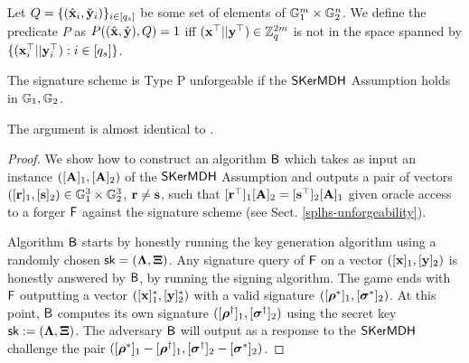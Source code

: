 Let $Q=\{ ({\hat{\mathbf{x}}}_i,\check{\mathbf{y}}_i) \}_{i \in [q_s]}$ be some set of elements of $\mathbb{G}_1^{m} \times \mathbb{G}_2^n$. We define the predicate $P$ as $P(({\hat{\mathbf{x}}},\check{\mathbf{y}}),Q)=1$ iff $(\mathbf{x}^{\top}||\mathbf{y}^{\top}) \in \mathbb{Z}_q^{2m}$ is not in the space spanned by $\{(\mathbf{x}_i^{\top}||\mathbf{y}_i^{\top}) :i \in [q_s]\}$. 

\begin{theorem} The signature scheme is Type P unforgeable if the $\mathsf{SKerMDH}$ Assumption holds in $\mathbb{G}_1,\mathbb{G}_2$.
\end{theorem}
The argument is almost identical to  \cite{C:LPJY13}.
\begin{proof} We show how to construct an algorithm $\mathsf{B}$ which takes as input an instance $([\mathbf{{A}}]_1,[\mathbf{{A}}]_2)$ of the $\mathsf{SKerMDH}$ Assumption and outputs a pair of vectors $([\mathbf{r}]_1,[\mathbf{s}]_2) \in \mathbb{G}_1^{3} \times \mathbb{G}_2^{3}$, $\mathbf{r} \neq \mathbf{s}$, such that 
$[\mathbf{r}^{\top}]_1 [\mathbf{{A}}]_2=[\mathbf{s}^{\top}]_2 [\mathbf{{A}}]_1$ given oracle access to a forger $\mathsf{F}$ against the signature scheme
(see Sect. \ref{splhs-unforgeability}). 

Algorithm $\mathsf{B}$ starts by honestly running the key generation algorithm 
using a randomly chosen $\mathsf{sk}=(\mathbf{{\Lambda}},\mathbf{{\Xi}})$. Any signature query of $\mathsf{F}$ on a vector
$([\mathbf{x}]_1,[\mathbf{y}]_2)$ is honestly answered by $\mathsf{B}$, by running the signing algorithm.
The game ends with $\mathsf{F}$ outputting a vector $([\mathbf{x}]_1^*,[\mathbf{y}]_2^*)$ 
with a valid signature $([{\boldsymbol \rho}^{*}]_1, [{\boldsymbol \sigma}^{*}]_2)$. At this point, $\mathsf{B}$ computes its own signature $([{\boldsymbol \rho}^{\dagger}]_1, [{\boldsymbol \sigma}^{\dagger}]_2)$ using the secret key $\mathsf{sk}:=(\mathbf{{\Lambda}},\mathbf{{\Xi}})$. The adversary $\mathsf{B}$ will output as a response to the $\mathsf{SKerMDH}$ challenge the pair $([{\boldsymbol \rho}^{*}]_1-[{\boldsymbol \rho}^{\dagger}]_1,[ {\boldsymbol \sigma}^{\dagger}]_2-[{\boldsymbol \sigma}^{*}]_2)$.


\end{proof}
